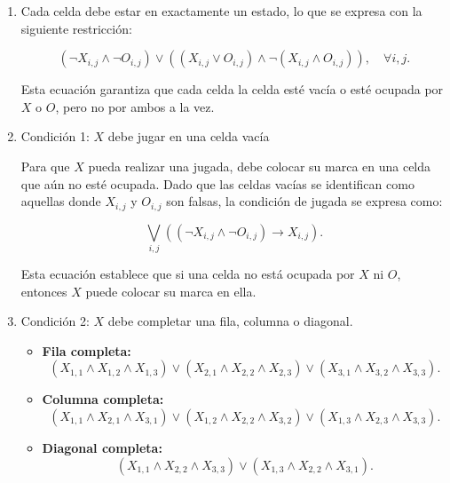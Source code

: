 \begin{enumerate}
\item Cada celda debe estar en exactamente un estado, lo que se expresa con la siguiente restricción:

\begin{equation}
    (\neg X_{i,j} \land \neg O_{i,j}) \lor \left( (X_{i,j} \lor O_{i,j})  \land 
    \neg(X_{i,j} \land O_{i,j}) \right), \quad \forall i,j.
\end{equation}

Esta ecuación garantiza que cada celda la celda esté vacía o esté ocupada por \(X\) o \(O\), pero no por ambos a la vez.

\item Condición 1: \(X\) debe jugar en una celda vacía

Para que \(X\) pueda realizar una jugada, debe colocar su marca en una celda que aún no esté ocupada. Dado que las celdas vacías se identifican como aquellas donde \(X_{i,j}\) y \(O_{i,j}\) son falsas, la condición de jugada se expresa como:

\begin{equation}
    \bigvee_{i,j} ((\neg X_{i,j} \land \neg O_{i,j}) \rightarrow X_{i,j}).
\end{equation}

Esta ecuación establece que si una celda no está ocupada por \(X\) ni \(O\), entonces \(X\) puede colocar su marca en ella.

\item Condición 2: \(X\) debe completar una fila, columna o diagonal.


\begin{itemize}
    \item \textbf{Fila completa:}
    \begin{equation}
        (X_{1,1} \land X_{1,2} \land X_{1,3}) \lor
        (X_{2,1} \land X_{2,2} \land X_{2,3}) \lor
        (X_{3,1} \land X_{3,2} \land X_{3,3}).
    \end{equation}

    \item \textbf{Columna completa:}
    \begin{equation}
        (X_{1,1} \land X_{2,1} \land X_{3,1}) \lor
        (X_{1,2} \land X_{2,2} \land X_{3,2}) \lor
        (X_{1,3} \land X_{2,3} \land X_{3,3}).
    \end{equation}

    \item \textbf{Diagonal completa:}
    \begin{equation}
        (X_{1,1} \land X_{2,2} \land X_{3,3}) \lor
        (X_{1,3} \land X_{2,2} \land X_{3,1}).
    \end{equation}
\end{itemize}

\end{enumerate}

